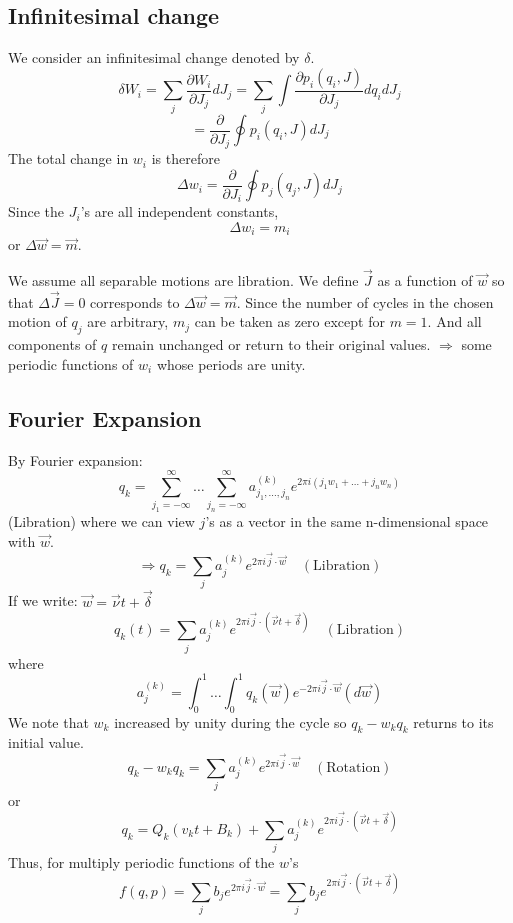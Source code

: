 \documentclass{article}
\begin{document}
	\subsection*{Infinitesimal change}
	We consider an infinitesimal change denoted by $\delta$.
	\[ \delta W_i = \sum_j \frac{\partial W_i}{\partial J_j} dJ_j = \sum_j \int \frac{\partial p_i(q_i, J)}{\partial J_j} dq_i dJ_j \]
	\[ = \frac{\partial}{\partial J_j} \oint p_i(q_i, J) dJ_j \]
	The total change in $w_i$ is therefore
	\[ \Delta w_i = \frac{\partial}{\partial J_i} \oint p_j(q_j, J) dJ_j \]
	Since the $J_i$'s are all independent constants,
	\[ \Delta w_i = m_i \]
	or $\Delta \vec{w} = \vec{m}$.
	
	We assume all separable motions are libration. We define $\vec{J}$ as a function of $\vec{w}$ so that $\Delta \vec{J}=0$ corresponds to $\Delta \vec{w} = \vec{m}$.
	Since the number of cycles in the chosen motion of $q_j$ are arbitrary, $m_j$ can be taken as zero except for $m=1$. And all components of $q$ remain unchanged or return to their original values. $\Rightarrow$ some periodic functions of $w_i$ whose periods are unity.
	
	\subsection*{Fourier Expansion}
	By Fourier expansion:
	\[ q_k = \sum_{j_1=-\infty}^{\infty} \dots \sum_{j_n=-\infty}^{\infty} a_{j_1, \dots, j_n}^{(k)} e^{2\pi i (j_1 w_1 + \dots + j_n w_n)} \]
	(Libration)
	where we can view $j$'s as a vector in the same n-dimensional space with $\vec{w}$.
	\[ \Rightarrow q_k = \sum_j a_j^{(k)} e^{2\pi i \vec{j} \cdot \vec{w}} \quad (\text{Libration}) \]
	If we write: $\vec{w} = \vec{\nu}t + \vec{\delta}$
	\[ q_k(t) = \sum_j a_j^{(k)} e^{2\pi i \vec{j} \cdot (\vec{\nu}t + \vec{\delta})} \quad (\text{Libration}) \]
	where
	\[ a_j^{(k)} = \int_0^1 \dots \int_0^1 q_k(\vec{w}) e^{-2\pi i \vec{j} \cdot \vec{w}} (d\vec{w}) \]
	We note that $w_k$ increased by unity during the cycle so $q_k - w_k q_k$ returns to its initial value.
	\[ q_k - w_k q_k = \sum_j a_j^{(k)} e^{2\pi i \vec{j} \cdot \vec{w}} \quad (\text{Rotation}) \]
	or
	\[ q_k = Q_k(v_k t + B_k) + \sum_j a_j^{(k)} e^{2\pi i \vec{j} \cdot (\vec{\nu}t + \vec{\delta})} \]
	Thus, for multiply periodic functions of the $w$'s
	\[ f(q,p) = \sum_j b_j e^{2\pi i \vec{j} \cdot \vec{w}} = \sum_j b_j e^{2\pi i \vec{j} \cdot (\vec{\nu}t + \vec{\delta})} \]
	
\end{document}
